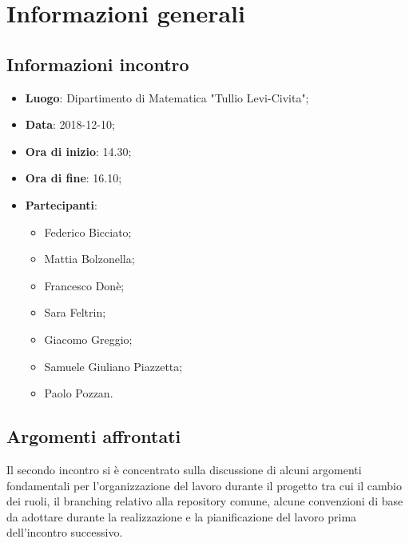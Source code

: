 \section{Informazioni generali}

\subsection{Informazioni incontro}
\begin{itemize}
\item \textbf{Luogo}: Dipartimento di Matematica "Tullio Levi-Civita";
\item \textbf{Data}: 2018-12-10;
\item \textbf{Ora di inizio}: 14.30;
\item \textbf{Ora di fine}: 16.10;
\item \textbf{Partecipanti}:
\begin{itemize}
	\item Federico Bicciato;
	\item Mattia Bolzonella;
	\item Francesco Donè;
	\item Sara Feltrin;
	\item Giacomo Greggio;
	\item Samuele Giuliano Piazzetta;
	\item Paolo Pozzan.
\end{itemize}
\end{itemize}

\subsection{Argomenti affrontati}
Il secondo incontro si è concentrato sulla discussione di alcuni argomenti fondamentali per l'organizzazione del lavoro durante il progetto tra cui il cambio dei ruoli, il branching relativo alla repository comune, alcune convenzioni di base da adottare durante la realizzazione e la pianificazione del lavoro prima dell'incontro successivo.

